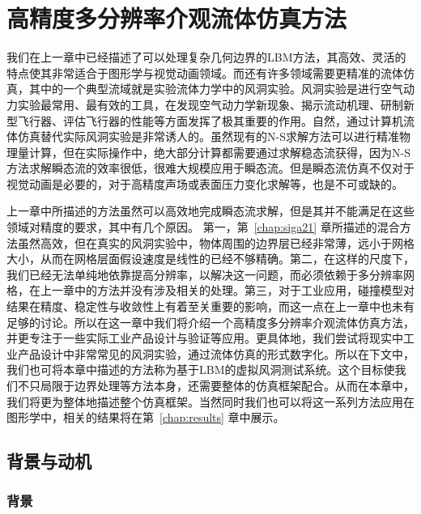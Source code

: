 \chapter{高精度多分辨率介观流体仿真方法}
\label{chap:sig23}
我们在上一章中已经描述了可以处理复杂几何边界的LBM方法，其高效、灵活的特点使其非常适合于图形学与视觉动画领域。而还有许多领域需要更精准的流体仿真，其中的一个典型流域就是实验流体力学中的风洞实验。风洞实验是进行空气动力实验最常用、最有效的工具，在发现空气动力学新现象、揭示流动机理、研制新型飞行器、评估飞行器的性能等方面发挥了极其重要的作用。自然，通过计算机流体仿真替代实际风洞实验是非常诱人的。虽然现有的N-S求解方法可以进行精准物理量计算，但在实际操作中，绝大部分计算都需要通过求解稳态流获得，因为N-S方法求解瞬态流的效率很低，很难大规模应用于瞬态流。但是瞬态流仿真不仅对于视觉动画是必要的，对于高精度声场或表面压力变化求解等，也是不可或缺的。

上一章中所描述的方法虽然可以高效地完成瞬态流求解，但是其并不能满足在这些领域对精度的要求，其中有几个原因。
第一，第~\ref{chap:siga21} 章所描述的混合方法虽然高效，但在真实的风洞实验中，物体周围的边界层已经非常薄，远小于网格大小，从而在网格层面假设速度是线性的已经不够精确。第二，在这样的尺度下，我们已经无法单纯地依靠提高分辨率，以解决这一问题，而必须依赖于多分辨率网格，在上一章中的方法并没有涉及相关的处理。第三，对于工业应用，碰撞模型对结果在精度、稳定性与收敛性上有着至关重要的影响，而这一点在上一章中也未有足够的讨论。所以在这一章中我们将介绍一个高精度多分辨率介观流体仿真方法，并更专注于一些实际工业产品设计与验证等应用。更具体地，我们尝试将现实中工业产品设计中非常常见的风洞实验，通过流体仿真的形式数字化。所以在下文中，我们也可将本章中描述的方法称为基于LBM的虚拟风洞测试系统。这个目标使我们不只局限于边界处理等方法本身，还需要整体的仿真框架配合。从而在本章中，我们将更为整体地描述整个仿真框架。当然同时我们也可以将这一系列方法应用在图形学中，相关的结果将在第~\ref{chap:results} 章中展示。

\section{背景与动机}
\subsection{背景}
